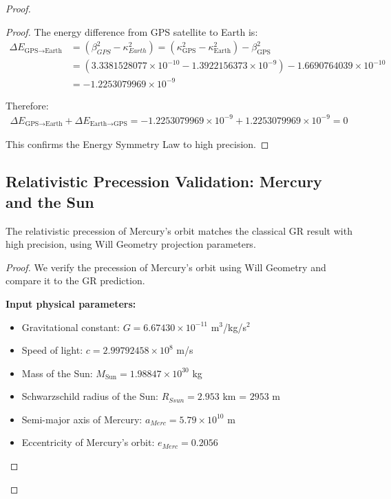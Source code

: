 \documentclass{article}
\begin{document}
\begin{proof}
\begin{proof}
The energy difference from GPS satellite to Earth is:
\begin{align}
\Delta E_{\text{GPS} \rightarrow \text{Earth}} &= \left(\beta_{GPS}^{2}-\kappa_{Earth}^{2}\right)=(\kappa^2_{\text{GPS}} - \kappa^2_{\text{Earth}}) - \beta^2_{\text{GPS}} \\
&= (3.3381528077\times10^{-10} - 1.3922156373\times10^{-9}) - 1.6690764039\times10^{-10} \\
&= -1.2253079969\times10^{-9}
\end{align}

Therefore:
\begin{align}
\Delta E_{\text{GPS} \rightarrow \text{Earth}}+\Delta E_{\text{Earth} \rightarrow \text{GPS}}  = -1.2253079969\times10^{-9} + 1.2253079969\times10^{-9} = 0
\end{align}

This confirms the Energy Symmetry Law to high precision.
\end{proof}

\subsection{Relativistic Precession Validation: Mercury and the Sun}

\begin{theorem}
The relativistic precession of Mercury's orbit matches the classical GR result with high precision, using Will Geometry projection parameters.
\end{theorem}

\begin{proof}
We verify the precession of Mercury's orbit using Will Geometry and compare it to the GR prediction.

\textbf{Input physical parameters:}
\begin{itemize}
\item Gravitational constant: $G = 6.67430 \times 10^{-11}$ m$^3$/kg/s$^2$
\item Speed of light: $c = 2.99792458 \times 10^8$ m/s
\item Mass of the Sun: $M_{\text{Sun}} = 1.98847 \times 10^{30}$ kg
\item Schwarzschild radius of the Sun: $R_{Ssun} = 2.953$ km = $2953$ m
\item Semi-major axis of Mercury: $a_{Merc} = 5.79 \times 10^{10}$ m
\item Eccentricity of Mercury's orbit: $e_{Merc} = 0.2056$
\end{itemize}


\end{proof}
\end{proof}
\end{document}

